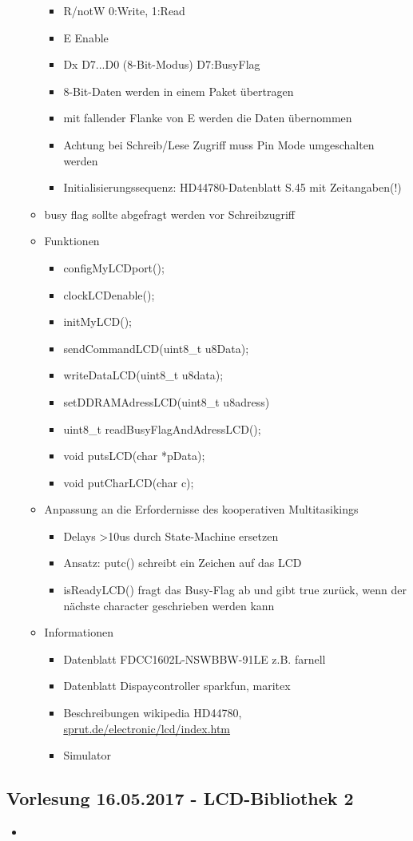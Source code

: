 \begin{itemize}
\begin{itemize}
\begin{itemize}
			\item R/notW 0:Write, 1:Read
			\item E Enable
			\item Dx D7...D0 (8-Bit-Modus) D7:BusyFlag
			\item 8-Bit-Daten werden in einem Paket übertragen
			\item mit fallender Flanke von E werden die Daten übernommen
			\item Achtung bei Schreib/Lese Zugriff muss Pin Mode umgeschalten werden
			\item Initialisierungssequenz: HD44780-Datenblatt S.45 mit Zeitangaben(!)
		\end{itemize}
		\item busy flag sollte abgefragt werden vor Schreibzugriff
		\item Funktionen
		\begin{itemize}
			\item configMyLCDport();
			\item clockLCDenable();
			\item initMyLCD();
			\item sendCommandLCD(uint8\_t u8Data);
			\item writeDataLCD(uint8\_t u8data);
			\item setDDRAMAdressLCD(uint8\_t u8adress)
			\item uint8\_t readBusyFlagAndAdressLCD();
			\item void putsLCD(char *pData);
			\item void putCharLCD(char c);
		\end{itemize}
		\item Anpassung an die Erfordernisse des kooperativen Multitasikings
		\begin{itemize}
			\item Delays >10us durch State-Machine ersetzen
			\item Ansatz: putc() schreibt ein Zeichen auf das LCD
			\item isReadyLCD() fragt das Busy-Flag ab und gibt true zurück, wenn der nächste character geschrieben werden kann
		\end{itemize}
			\item Informationen
		\begin{itemize}
			\item Datenblatt FDCC1602L-NSWBBW-91LE z.B. farnell
			\item Datenblatt Dispaycontroller sparkfun, maritex
			\item Beschreibungen wikipedia HD44780, \url{sprut.de/electronic/lcd/index.htm}
			\item Simulator
		\end{itemize}
\end{itemize}
\end{itemize}

\subsection{Vorlesung 16.05.2017 - LCD-Bibliothek 2}
\begin{itemize}
	\item 
\end{itemize}
